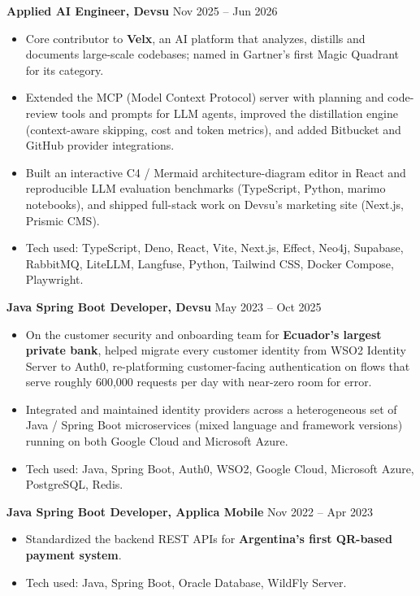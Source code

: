 \documentclass[10pt, a4paper]{article}
\begin{document}
\textbf{Applied AI Engineer, Devsu} \hfill Nov 2025 -- Jun 2026
\begin{itemize}[leftmargin=10pt, noitemsep]
    \item Core contributor to \textbf{Velx}, an AI platform that analyzes, distills and documents large-scale codebases; named in Gartner's first Magic Quadrant for its category.
    \item Extended the MCP (Model Context Protocol) server with planning and code-review tools and prompts for LLM agents, improved the distillation engine (context-aware skipping, cost and token metrics), and added Bitbucket and GitHub provider integrations.
    \item Built an interactive C4 / Mermaid architecture-diagram editor in React and reproducible LLM evaluation benchmarks (TypeScript, Python, marimo notebooks), and shipped full-stack work on Devsu's marketing site (Next.js, Prismic CMS).
    \item Tech used: TypeScript, Deno, React, Vite, Next.js, Effect, Neo4j, Supabase, RabbitMQ, LiteLLM, Langfuse, Python, Tailwind CSS, Docker Compose, Playwright.
\end{itemize}

\textbf{Java Spring Boot Developer, Devsu} \hfill May 2023 -- Oct 2025
\begin{itemize}[leftmargin=10pt, noitemsep]
    \item On the customer security and onboarding team for \textbf{Ecuador's largest private bank}, helped migrate every customer identity from WSO2 Identity Server to Auth0, re-platforming customer-facing authentication on flows that serve roughly 600,000 requests per day with near-zero room for error.
    \item Integrated and maintained identity providers across a heterogeneous set of Java / Spring Boot microservices (mixed language and framework versions) running on both Google Cloud and Microsoft Azure.
    \item Tech used: Java, Spring Boot, Auth0, WSO2, Google Cloud, Microsoft Azure, PostgreSQL, Redis.
\end{itemize}

\textbf{Java Spring Boot Developer, Applica Mobile} \hfill Nov 2022 -- Apr 2023
\begin{itemize}[leftmargin=10pt, noitemsep]
    \item Standardized the backend REST APIs for \textbf{Argentina's first QR-based payment system}.
    \item Tech used: Java, Spring Boot, Oracle Database, WildFly Server.
\end{itemize}
\end{document}
